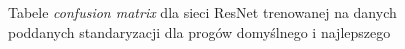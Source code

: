 \documentclass[polish,12pt]{aghthesis}
\begin{document}
\begin{figure}[H]
    \begin{adjustbox}{minipage=1.0\paperwidth, pagecenter}
    \centering
    \qquad
    \end{adjustbox}
    \label{fig:resnet-sth-thresh-matrices}
    \caption{Tabele \textit{confusion matrix} dla sieci ResNet trenowanej na danych poddanych standaryzacji dla progów domyślnego i najlepszego}
\end{figure}
\end{document}
